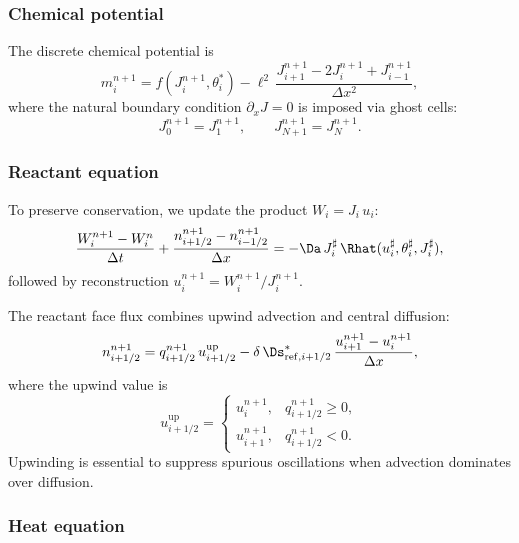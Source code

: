 \subsubsection{Chemical potential}

The discrete chemical potential is
\begin{equation}
  m_i^{n+1}
  = f(J_i^{n+1},\theta_i^{*})
  - \ell^2\,\frac{J_{i+1}^{n+1} - 2J_i^{n+1} + J_{i-1}^{n+1}}{\Delta x^2},
  \label{eq:disc_m}
\end{equation}
where the natural boundary condition $\partial_x J = 0$ is imposed via ghost cells:
\begin{equation}
  J_0^{n+1} = J_1^{n+1}, \qquad J_{N+1}^{n+1} = J_N^{n+1}.
  \label{eq:ghost_J}
\end{equation}

\subsubsection{Reactant equation}

To preserve conservation, we update the product $W_i = J_i\,u_i$:
\begin{equation}
  \frac{W_i^{n+1} - W_i^{n}}{\Delta t}
  + \frac{n_{i+1/2}^{n+1} - n_{i-1/2}^{n+1}}{\Delta x}
  = -\Da\,J_i^{\sharp}\,\Rhat(u_i^{\sharp},\theta_i^{\sharp},J_i^{\sharp}),
  \label{eq:disc_W}
\end{equation}
followed by reconstruction $u_i^{n+1} = W_i^{n+1}/J_i^{n+1}$.

The reactant face flux combines upwind advection and central diffusion:
\begin{equation}
  n_{i+1/2}^{n+1}
  = q_{i+1/2}^{n+1}\,u_{i+1/2}^\mathrm{up}
  - \delta\,\Ds_{\mathrm{ref},i+1/2}^{*}\,
  \frac{u_{i+1}^{n+1} - u_i^{n+1}}{\Delta x},
  \label{eq:disc_n}
\end{equation}
where the upwind value is
\begin{equation}
  u_{i+1/2}^\mathrm{up}
  = \begin{cases}
    u_i^{n+1}, & q_{i+1/2}^{n+1} \ge 0, \\[4pt]
    u_{i+1}^{n+1}, & q_{i+1/2}^{n+1} < 0.
  \end{cases}
  \label{eq:upwind}
\end{equation}
Upwinding is essential to suppress spurious oscillations when advection dominates over diffusion.

\subsubsection{Heat equation}

